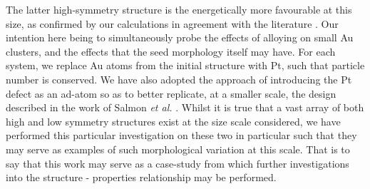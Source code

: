 The latter high-symmetry structure is the energetically more favourable at this size, as confirmed by our calculations in agreement with the literature \cite{Rapacioli2018,Gruene2008}. Our intention here being to simultaneously probe the effects of alloying on small Au clusters, and the effects that the seed morphology itself may have. For each system, we replace Au atoms from the initial structure with Pt, such that particle number is conserved. We have also adopted the approach of introducing the Pt defect as an ad-atom so as to better replicate, at a smaller scale, the design described in the work of Salmon \textit{et al.} \cite{JorgeStructure}. 
Whilst it is true that a vast array of both high and low symmetry structures exist at the size scale considered, we have performed this particular investigation on these two in particular such that they may serve as examples of such morphological variation at this scale. That is to say that this work may serve as a case-study from which further investigations into the structure - properties relationship may be performed.

